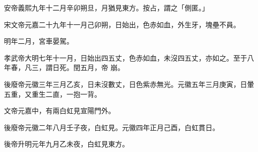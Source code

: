 \begin{pinyinscope}
 安帝義熙九年十二月辛卯朔旦，月猶見東方。按占，謂之「側匿。」



 宋文帝元嘉二十九年十一月己卯朔，日始出，色赤如血，外生牙，塊壘不員。



 明年二月，宮車晏駕。



 孝武帝大明七年十一月，日始出四五丈，色赤如血，未沒四五丈，亦如之。至于八年春，凡三，謂日死。閏五月，帝
 崩。



 後廢帝元徽三年三月乙亥，日未沒數丈，日色紫赤無光。元徽五年三月庚寅，日暈五重，又重生二直，一抱一背。



 文帝元嘉中，有兩白虹見宣陽門外。



 後廢帝元徽二年八月壬子夜，白虹見。元徽四年正月己酉，白虹貫日。



 後帝升明元年九月乙未夜，白虹見東方。



\end{pinyinscope}